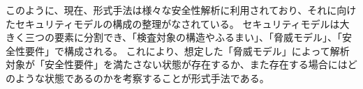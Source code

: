 \documentclass[journal]{IEEEtran}
\begin{document}
このように、現在、形式手法は様々な安全性解析に利用されており、それに向けたセキュリティモデルの構成の整理がなされている\cite{security_modeling_and_analysis}。
セキュリティモデルは大きく三つの要素に分割でき、「検査対象の構造やふるまい」、「脅威モデル」、「安全性要件」で構成される。
これにより、想定した「脅威モデル」によって解析対象が「安全性要件」を満たさない状態が存在するか、また存在する場合にはどのような状態であるのかを考察することが形式手法である。
\end{document}
